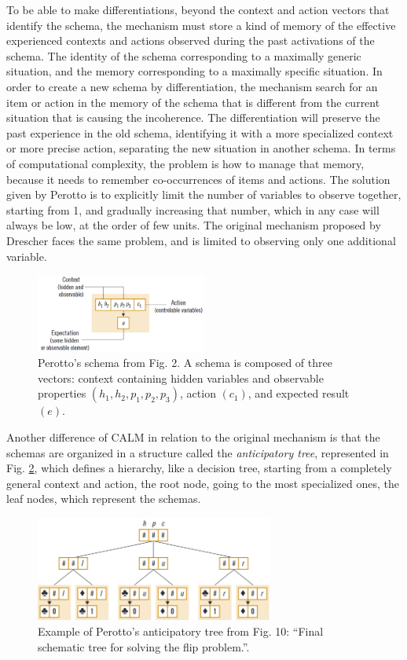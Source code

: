 \documentclass[runningheads]{llncs}
\begin{document}
To be able to make differentiations, beyond the context and action vectors that identify the schema, the mechanism must store a kind of memory of the effective experienced contexts and actions observed during the past activations of the schema.
The identity of the schema corresponding to a maximally generic situation, and the memory corresponding to a maximally specific situation.
In order to create a new schema by differentiation, the mechanism search for an item or action in the memory of the schema that is different from the current situation that is causing the incoherence. 
The differentiation will preserve the past experience in the old schema, identifying it with a more specialized context or more precise action, separating the new situation in another schema.
In terms of computational complexity, the problem is how to manage that memory, because it needs to remember co-occurrences of items and actions.
The solution given by Perotto is to explicitly limit the number of variables to observe together, starting from 1, and gradually increasing that number, which in any case will always be low, at the order of few units.
The original mechanism proposed by Drescher faces the same problem, and is limited to observing only one additional variable.

\begin{figure}
	\centering
	\includegraphics[width=0.5\textwidth]{Figure_perotto.png}
	\caption{Perotto's schema from \cite{Perotto:2013:CF} Fig. 2.
		A schema is composed of three vectors: context containing hidden variables and observable properties $(h_1, h_2, p_1, p_2, p_3)$, action $(c_1)$, and expected result $(e)$. } 
	\label{fig:perotto}
\end{figure}

Another difference of CALM in relation to the original mechanism is that the schemas are organized in a structure called the \textit{anticipatory tree}, represented in Fig. \ref{fig:perotto_tree}, which defines a hierarchy, like a decision tree, starting from a completely general context and action, the root node, going to the most specialized ones, the leaf nodes, which represent the schemas.

\begin{figure}
	\centering
	\includegraphics[width=0.7\textwidth]{Figure_perotto_tree.png}
	\caption{Example of Perotto's anticipatory tree from \cite{Perotto:2013:CF} Fig. 10: ``Final schematic tree for solving the flip problem.''.
 } 
	\label{fig:perotto_tree}
\end{figure}
\end{document}
